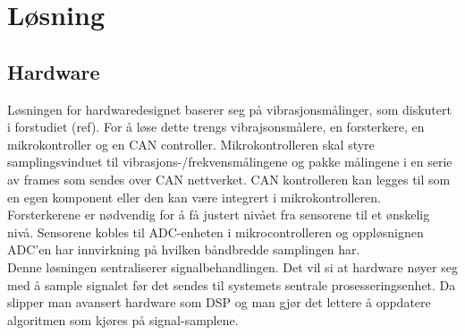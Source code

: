\chapter{Løsning}


\section{Hardware}

Løsningen for hardwaredesignet baserer seg på vibrasjonsmålinger, som diskutert
i forstudiet (ref). For å løse dette trengs vibrajsonsmålere, en forsterkere,
en mikrokontroller og en CAN controller. Mikrokontrolleren skal styre
samplingsvinduet til vibrasjons-/frekvensmålingene og pakke målingene i en serie
av frames som sendes over CAN nettverket. CAN kontrolleren kan legges til som en
egen komponent eller den kan være integrert i mikrokontrolleren. Forsterkerene er
nødvendig for å få justert nivået fra sensorene til et ønskelig nivå. Sensorene
kobles til ADC-enheten i mikrocontrolleren og oppløsnignen ADC'en
har innvirkning på hvilken båndbredde samplingen har. \\

Denne løsningen sentraliserer signalbehandlingen. Det vil si at hardware nøyer
seg med å sample signalet før det sendes til systemets sentrale
prosesseringsenhet. Da slipper man avansert hardware som DSP og man gjør det
lettere å oppdatere algoritmen som kjøres på signal-samplene.
